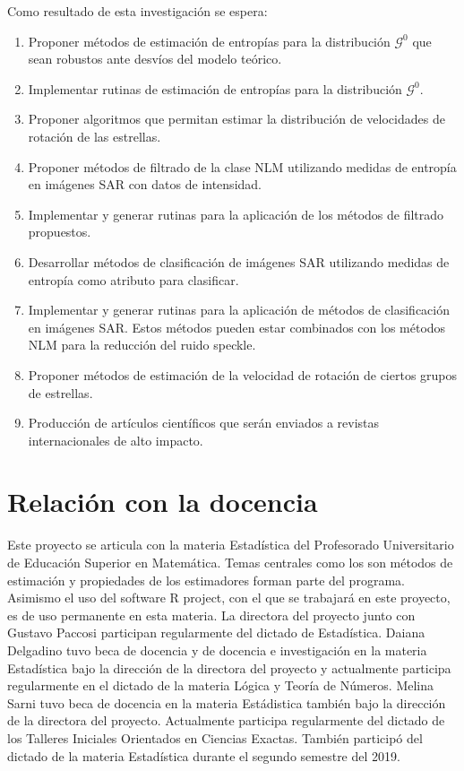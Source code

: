 \documentclass[11pt]{article}
\begin{document}
Como resultado de esta investigación se espera:

\begin{enumerate}
	\item Proponer métodos de estimación de entropías para la distribución $\mathcal{G}^0$ que sean robustos ante desvíos del modelo teórico.
	\item Implementar rutinas de estimación de entropías para la distribución $\mathcal{G}^0$.
	\item Proponer algoritmos que permitan estimar la distribución de velocidades de rotación de las estrellas.
	\item Proponer métodos de filtrado de la clase NLM utilizando medidas de entropía en imágenes SAR con datos de intensidad.
	\item Implementar y generar rutinas para la aplicación de los métodos de filtrado propuestos.
	\item Desarrollar métodos de clasificación de imágenes SAR utilizando medidas de entropía como atributo para clasificar.
	\item Implementar y generar rutinas para la aplicación de métodos de clasificación en imágenes SAR. Estos métodos pueden estar combinados con los métodos NLM para la reducción del ruido speckle.
	\item Proponer métodos de estimación de la velocidad de rotación de ciertos grupos de estrellas.
	\item Producción de artículos científicos que serán enviados a revistas internacionales de alto impacto. 
\end{enumerate}

\section{Relación con la docencia}

Este proyecto se articula con la materia Estadística del
Profesorado Universitario de Educación Superior en Matemática. Temas centrales como los son métodos de estimación y propiedades de los estimadores forman parte del programa. Asimismo el uso del software R project, con el que se trabajará en este proyecto, es de uso permanente en esta materia.
La directora del proyecto junto con Gustavo Paccosi participan regularmente del dictado de Estadística. Daiana Delgadino tuvo beca de docencia y de docencia e investigación en la materia Estadística bajo la dirección de la directora del proyecto y actualmente participa regularmente en el dictado de la materia Lógica y Teoría de Números. Melina Sarni tuvo beca de docencia en la materia Estádistica también bajo la dirección de la directora del proyecto. Actualmente participa regularmente del dictado de los Talleres Iniciales Orientados en Ciencias Exactas. También participó del dictado de la materia Estadística durante el segundo semestre del 2019.   
\end{document}
